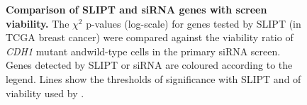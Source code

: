 \begin{figure}[!htbp]
\begin{center}
   \end{center}
   \caption[Comparison of SLIPT and siRNA genes with screen viability]{\small \textbf{Comparison of \gls{SLIPT} and \gls{siRNA} genes with screen viability.} The $\chi^2$ p-values (log-scale) for genes tested by \gls{SLIPT} (in \gls{TCGA} breast cancer) were compared against the viability ratio of \textit{CDH1} \gls{mutant} and\gls{wild-type} cells in the primary \gls{siRNA} screen. Genes detected by \gls{SLIPT} or \gls{siRNA} are coloured according to the legend. Lines show the thresholds of significance with \gls{SLIPT} and of viability used by \citet{Telford2015}. %
}
\label{fig:compare_points_viability_SL}


\end{figure}
